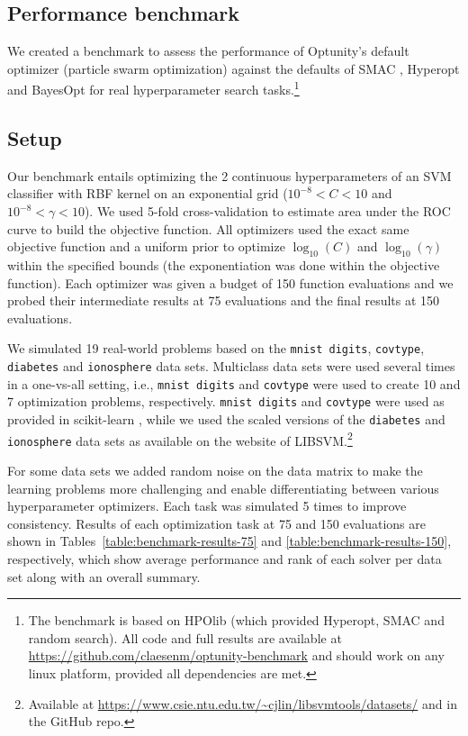\begin{subappendices}
%
%


\section{Performance benchmark} \label{optunity:benchmark}
We created a benchmark to assess the performance of Optunity's default optimizer (particle swarm optimization) against the defaults of SMAC \citep{hutter2011sequential}, Hyperopt \citep{bergstra2013hyperopt} and BayesOpt \citep{martinez2014bayesopt} for real hyperparameter search tasks.\footnote{The benchmark is based on HPOlib (which provided Hyperopt, SMAC and random search). All code and full results are available at \url{https://github.com/claesenm/optunity-benchmark} and should work on any linux platform, provided all dependencies are met.}

\subsection{Setup}
Our benchmark entails optimizing the 2 continuous hyperparameters of an SVM classifier with RBF kernel on an exponential grid ($10^{-8} < C < 10$ and $10^{-8} < \gamma < 10$). We used 5-fold cross-validation to estimate area under the ROC curve to build the objective function. All optimizers used the exact same objective function and a uniform prior to optimize $\log_{10}(C)$ and $\log_{10}(\gamma)$ within the specified bounds (the exponentiation was done within the objective function). Each optimizer was given a budget of 150 function evaluations and we probed their intermediate results at 75 evaluations and the final results at 150 evaluations.

We simulated 19 real-world problems based on the \texttt{mnist digits}, \texttt{covtype}, \texttt{diabetes} and \texttt{ionosphere} data sets. Multiclass data sets were used several times in a one-vs-all setting, i.e., \texttt{mnist digits} and \texttt{covtype} were used to create 10 and 7 optimization problems, respectively. \texttt{mnist digits} and \texttt{covtype} were used as provided in scikit-learn \citep{pedregosa2011scikit}, while we used the scaled versions of the \texttt{diabetes} and \texttt{ionosphere} data sets as available on the website of LIBSVM.\footnote{Available at \url{https://www.csie.ntu.edu.tw/~cjlin/libsvmtools/datasets/} and in the GitHub repo.} 

For some data sets we added random noise on the data matrix to make the learning problems more challenging and enable differentiating between various hyperparameter optimizers. Each task was simulated 5 times to improve consistency. Results of each optimization task at 75 and 150 evaluations are shown in Tables~\ref{table:benchmark-results-75} and \ref{table:benchmark-results-150}, respectively, which show average performance and rank of each solver per data set along with an overall summary.


\end{subappendices}
